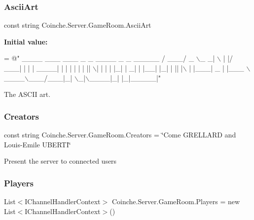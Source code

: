 \subsubsection{\texorpdfstring{Ascii\+Art}{AsciiArt}}
{\footnotesize\ttfamily const string Coinche.\+Server.\+Game\+Room.\+Ascii\+Art\hspace{0.3cm}{\ttfamily [private]}}

{\bfseries Initial value\+:}
\begin{DoxyCode}
= \textcolor{stringliteral}{@"   \_\_\_\_ \_\_\_ \_\_\_ \_ \_  \_\_\_\_ \_   \_ \_\_\_\_\_ }
\textcolor{stringliteral}{ / \_\_\_/ \_ \(\backslash\)\_ \_| \(\backslash\) | |/ \_\_\_| | | | \_\_\_\_|}
\textcolor{stringliteral}{| |  | | | | ||  \(\backslash\)| | |   | |\_| |  \_|  }
\textcolor{stringliteral}{| |\_\_| |\_| | || |\(\backslash\)  | |\_\_\_|  \_  | |\_\_\_ }
\textcolor{stringliteral}{ \(\backslash\)\_\_\_\_\(\backslash\)\_\_\_/\_\_\_|\_| \(\backslash\)\_|\(\backslash\)\_\_\_\_|\_| |\_|\_\_\_\_\_|"}
\end{DoxyCode}


The A\+S\+C\+II art. 

\mbox{\label{class_coinche_1_1_server_1_1_game_room_a4c8ca7fdee546c137ce5a62bc3812aab}} 
\subsubsection{\texorpdfstring{Creators}{Creators}}
{\footnotesize\ttfamily const string Coinche.\+Server.\+Game\+Room.\+Creators = \char`\"{}Come G\+R\+E\+L\+L\+A\+RD and Louis-\/Emile U\+B\+E\+R\+TI\char`\"{}\hspace{0.3cm}{\ttfamily [private]}}



Present the server to connected users 

\mbox{\label{class_coinche_1_1_server_1_1_game_room_a6e3fede9179111fa2d6fdfed2edb0133}} 
\subsubsection{\texorpdfstring{Players}{Players}}
{\footnotesize\ttfamily List$<$I\+Channel\+Handler\+Context$>$ Coinche.\+Server.\+Game\+Room.\+Players = new List$<$I\+Channel\+Handler\+Context$>$()\hspace{0.3cm}{\ttfamily [private]}}



